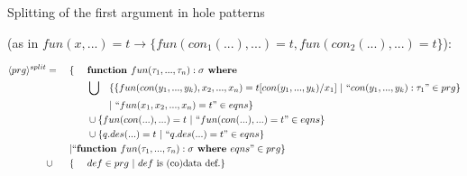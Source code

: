 \documentclass[11pt]{article} %
\begin{document}
Splitting of the first argument in hole patterns

(as in $fun(x,...) = t \rightarrow \{fun(con_1(...),...) = t, fun(con_2(...),...) = t\}$):

\begin{alignat*}{4}
\langle prg \rangle^{split} & = ~&& \{ ~&& \textrm{\textbf{function }} fun(\tau_1, ..., \tau_n): \sigma \textrm{\textbf{ where }} \span\span \\
& && && \bigcup && \{ \{ fun(con(y_1, ..., y_k), x_2, ..., x_n) = t[con(y_1, ..., y_k)/x_1] ~ | ~ `` con(y_1, ..., y_k): \tau_1 " \in prg \} \\
& && && && | ~ `` fun(x_1, x_2, ..., x_n) = t " \in eqns \} \\
& && && \cup \{ fun(con(...), ...) = t ~ | ~ `` fun(con(...), ...) = t " \in eqns \} \span\span \\
& && && \cup \{ q.des(...) = t ~ | ~ `` q.des(...) = t " \in eqns \} \span\span \\
& && | `` \textrm{\textbf{function }} fun(\tau_1, ..., \tau_n): \sigma \textrm{\textbf{ where }} eqns " \in prg \} \span\span\span\span \\
& \cup && \{ && def \in prg ~ | ~ def \textrm{ is (co)data def.} \} \span\span
\end{alignat*}
\end{document}
